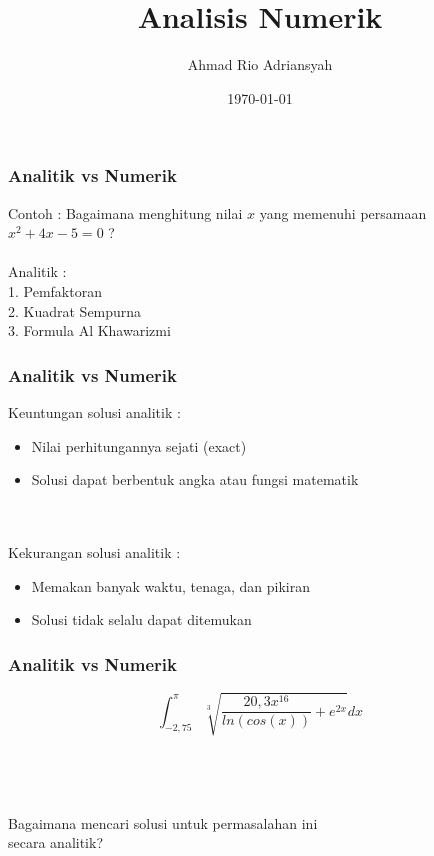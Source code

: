 \documentclass{beamer}
\title[Analisis Numerik]{Analisis Numerik} %
\author{Ahmad Rio Adriansyah} %
\institute[STT-NF] %
{
STT Terpadu - Nurul Fikri \\ %
\medskip
\textit{ahmad.rio.adriansyah@gmail.com
\\arasy@nurulfikri.ac.id} %
}
\date{\today} %
\begin{document}
\begin{frame}
\titlepage %
\end{frame}



\begin{frame}
\frametitle{Analitik vs Numerik}
Contoh : Bagaimana menghitung nilai $x$ yang memenuhi persamaan $x^2+4x-5=0$ ?
\\\ \\
Analitik :
\\1. Pemfaktoran
\\2. Kuadrat Sempurna
\\3. Formula Al Khawarizmi
\end{frame}


\begin{frame}
\frametitle{Analitik vs Numerik}
Keuntungan solusi analitik :
\begin{itemize}
\item Nilai perhitungannya sejati (exact)
\item Solusi dapat berbentuk angka atau fungsi matematik
\end{itemize}
\ \\\ \\
Kekurangan solusi analitik :
\begin{itemize}
\item Memakan banyak waktu, tenaga, dan pikiran
\item Solusi tidak selalu dapat ditemukan 
\end{itemize}

\end{frame}


\begin{frame}
\frametitle{Analitik vs Numerik}
\begin{equation}
\int_{-2,75}^{\pi} \sqrt[3]{\dfrac{20,3x^{16}}{ln(cos(x))}+e^{2x}} dx
\nonumber
\end{equation}
\ \\\ \\\ \\\ \\\qquad \qquad \quad Bagaimana mencari solusi untuk permasalahan ini\\\qquad \qquad \quad secara analitik?
\end{frame}
\end{document}
